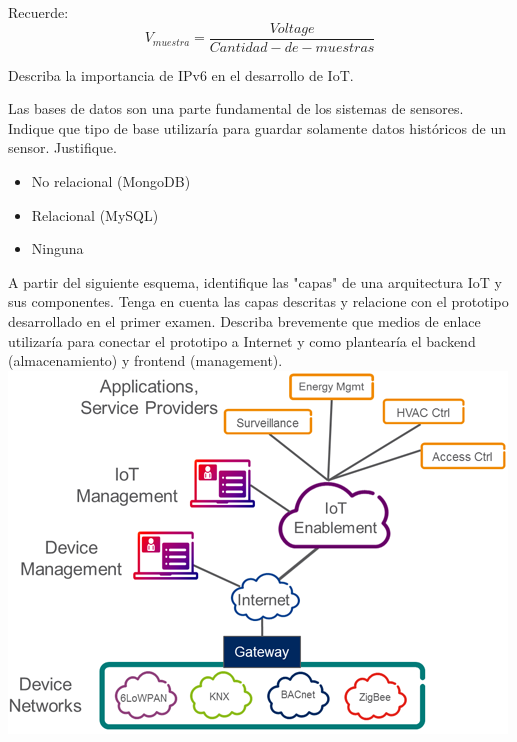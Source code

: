 \documentclass[11pt]{exam}
\begin{document}
\begin{questions}
Recuerde: 
$$V_{muestra} = \frac{Voltage}{Cantidad-de-muestras}$$


\addpoints
\question[3] Describa la importancia de IPv6 en el desarrollo de IoT.
\vspace{2in}

\addpoints
\question[2] Las bases de datos son una parte fundamental de los sistemas de sensores. Indique que tipo de base utilizaría para guardar solamente datos históricos de un sensor. Justifique.
\begin{itemize}
\item No relacional (MongoDB)
\item Relacional (MySQL)
\item Ninguna
\end{itemize}

\newpage
\addpoints
\question[4] A partir del siguiente esquema, identifique las "capas" de una arquitectura IoT y sus componentes. Tenga en cuenta las capas descritas y relacione con el prototipo desarrollado en el primer examen. Describa brevemente que medios de enlace utilizaría para conectar el prototipo a Internet y como plantearía el backend (almacenamiento) y frontend (management).\\

\includegraphics[scale=0.7]{iotarch.png} 






















\end{questions}
\end{document}
